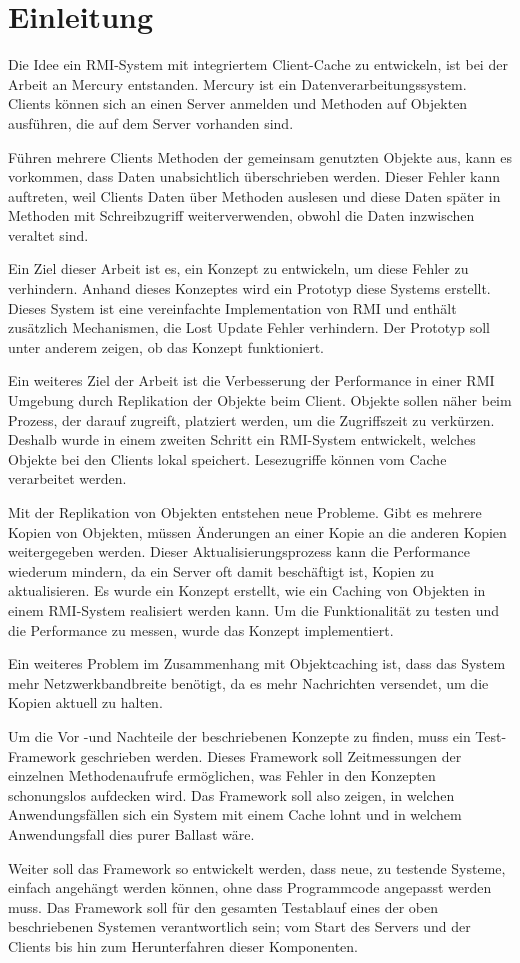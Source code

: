\chapter{Einleitung}

Die Idee ein RMI-System mit integriertem Client-Cache zu entwickeln, ist bei der Arbeit an Mercury entstanden. Mercury ist ein Datenverarbeitungssystem. Clients können sich an einen Server anmelden und Methoden auf Objekten ausführen, die auf dem Server vorhanden sind. 

Führen mehrere Clients Methoden der gemeinsam genutzten Objekte aus, kann es vorkommen, dass Daten unabsichtlich überschrieben werden. Dieser Fehler kann auftreten, weil Clients Daten über Methoden auslesen und diese Daten später in Methoden mit Schreibzugriff weiterverwenden, obwohl die Daten inzwischen veraltet sind.

Ein Ziel dieser Arbeit ist es, ein Konzept zu entwickeln, um diese Fehler zu verhindern. Anhand dieses Konzeptes wird ein Prototyp diese Systems erstellt. Dieses System ist eine vereinfachte Implementation von RMI und enthält zusätzlich Mechanismen, die Lost Update Fehler verhindern. Der Prototyp soll unter anderem zeigen, ob das Konzept funktioniert. 

Ein weiteres Ziel der Arbeit ist die Verbesserung der Performance in einer RMI Umgebung durch Replikation der Objekte beim Client. Objekte sollen näher beim Prozess, der darauf zugreift, platziert werden, um die Zugriffszeit zu verkürzen. Deshalb wurde in einem zweiten Schritt ein RMI-System entwickelt, welches Objekte bei den Clients lokal speichert. Lesezugriffe können vom Cache verarbeitet werden.

Mit der Replikation von Objekten entstehen neue Probleme. Gibt es mehrere Kopien von Objekten, müssen Änderungen an einer Kopie an die anderen Kopien weitergegeben werden. Dieser Aktualisierungsprozess kann die Performance wiederum mindern, da ein Server oft damit beschäftigt ist, Kopien zu aktualisieren. Es wurde ein Konzept erstellt, wie ein Caching von Objekten in einem RMI-System realisiert werden kann. Um die Funktionalität zu testen und die Performance zu messen, wurde das Konzept implementiert. 

Ein weiteres Problem im Zu\-sam\-men\-hang mit Objekt\-caching ist, dass das Sy\-stem mehr Netzwerkbandbreite benötigt, da es mehr Nachrichten versendet, um die Kopien aktuell zu halten.

Um die Vor -und Nachteile der beschriebenen Konzepte zu finden, muss ein Test-Framework geschrieben werden. Dieses Framework soll Zeitmessungen der einzelnen Methodenaufrufe ermöglichen, was Fehler in den Konzepten schonungslos aufdecken wird. Das Framework soll also zeigen, in welchen Anwendungsfällen sich ein System mit einem Cache lohnt und in welchem Anwendungsfall dies purer Ballast wäre.

Weiter soll das Framework so entwickelt werden, dass neue, zu testende Systeme, einfach angehängt werden können, ohne dass Programmcode angepasst werden muss. Das Framework soll für den gesamten Testablauf eines der oben beschriebenen Systemen verantwortlich sein; vom Start des Servers und der Clients bis hin zum Herunterfahren dieser Komponenten.


